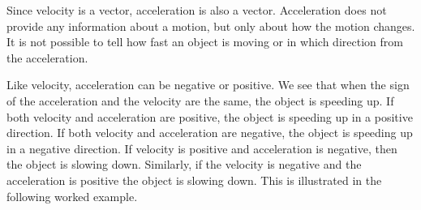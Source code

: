       
      \label{m38794*id67742}\nopagebreak\noindent{}
    
      
      \label{m38794*id67769}Since velocity is a vector, acceleration is also a vector. Acceleration does not provide any information about a motion, but only about how the motion changes. It is not possible to tell how fast an object is moving or in which direction from the acceleration.\par 
      \label{m38794*id67775}Like velocity, acceleration can be negative or positive. We see that when the sign of the acceleration and the velocity are the same, the object is speeding up. If both velocity and acceleration are positive, the object is speeding up in a positive direction. If both velocity and acceleration are negative, the object is speeding up in a negative direction.
If velocity is positive and acceleration is negative, then the object is slowing down. Similarly, if the velocity is negative and the acceleration is positive the object is slowing down. This is illustrated in the following worked example.\par 
\label{m38794*secfhsst!!!underscore!!!id1419}\vspace{.5cm} 
      
